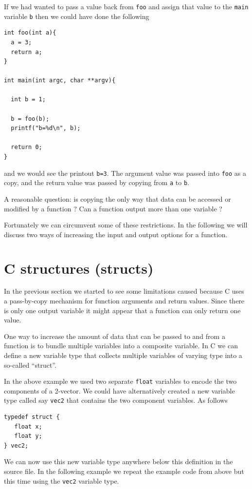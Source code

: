 If we had wanted to pass a value back from \texttt{foo} and assign that value to the \texttt{main} variable \texttt{b} then we could have done the following 

\begin{verbatim}
int foo(int a){
  a = 3;
  return a;
}

int main(int argc, char **argv){
  
  int b = 1;
  
  b = foo(b);
  printf("b=%d\n", b);

  return 0;
}
\end{verbatim}
and we would see the printout \texttt{b=3}. The argument value was passed into \texttt{foo} as a copy, and the return value was passed by copying from \texttt{a} to \texttt{b}.

A reasonable question: is copying the only way that data can be accessed or modified by a function ? Can a function output more than one variable ? 

Fortunately we can circumvent some of these restrictions. In the following we will discuss two ways of increasing the input and output options for a function.

\newpage
\section{C structures (structs)}

In the previous section we started to see some limitations caused because C uses a pass-by-copy mechanism for function arguments and return values. Since there is only one output variable it might appear that a function can only return one value.

One way to increase the amount of data that can be passed to and from a function is to bundle multiple variables into a composite variable. In C we can define a new variable type that collects multiple variables of varying type into a so-called ``struct''.

In the above example we used two separate \texttt{float} variables to encode the two components of a 2-vector. We could have alternatively created a new variable type called say \texttt{vec2} that contains the two component variables. As follows

\begin{verbatim}
typedef struct {
   float x;
   float y;
} vec2;
\end{verbatim}

We can now use this new variable type anywhere below this definition in the source file. In the following example we repeat the example code from above but this time using the \texttt{vec2} variable type.

